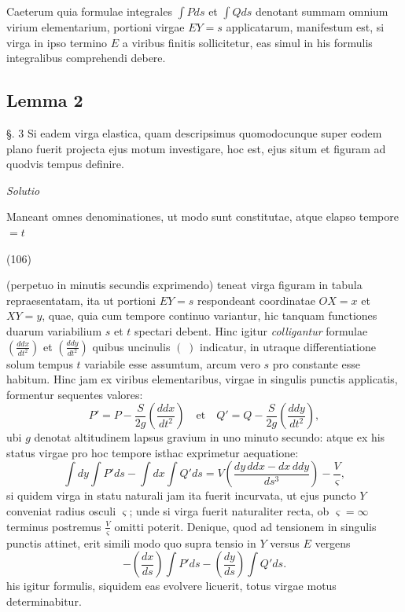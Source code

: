 \documentclass[11pt,a4paper]{article}
\begin{document}
Caeterum quia formulae integrales $\int Pds$ et $\int Qds$ denotant summam
omnium virium elementarium, portioni virgae $EY = s$ applicatarum,
manifestum est, si virga in ipso termino $E$ a viribus finitis
sollicitetur, eas simul in his formulis integralibus comprehendi debere.

\subsection{Lemma 2}

§. 3 Si eadem virga elastica, quam descripsimus quomodocunque super eodem
plano fuerit projecta ejus motum investigare, hoc est, ejus situm et
figuram ad quodvis tempus definire.

\emph{Solutio}

Maneant omnes denominationes, ut modo sunt constitutae, atque elapso
tempore $= t$

(106)

(perpetuo in minutis secundis exprimendo) teneat virga figuram in tabula
repraesentatam, ita ut portioni $EY = s$ respondeant coordinatae $OX = x$ et
$XY = y$, quae, quia cum tempore continuo variantur, hic tanquam functiones
duarum variabilium $s$ et $t$ spectari debent. Hinc igitur \emph{colligantur}
formulae $\left(\frac{ddx}{dt^2}\right)$ et $\left(\frac{ddy}{dt^2}\right)$
quibus uncinulis $(\;)$ indicatur, in utraque differentiatione solum tempus
$t$ variabile esse assumtum, arcum vero $s$ pro constante esse habitum. Hinc
jam ex viribus elementaribus, virgae in singulis punctis applicatis,
formentur sequentes valores:
\[
P' = P - \frac{S}{2g}\left(\frac{ddx}{dt^2}\right) \quad\text{et}\quad
Q' = Q - \frac{S}{2g}\left(\frac{ddy}{dt^2}\right),
\]
ubi $g$ denotat altitudinem lapsus gravium in uno minuto secundo: atque ex
his status virgae pro hoc tempore isthac exprimetur aequatione:
\[
\int dy \int P'ds - \int dx \int Q'ds
= V\left(\frac{dy\,ddx - dx\,ddy}{ds^3}\right) - \frac{V}{\varsigma},
\]
si quidem virga in statu naturali jam ita fuerit incurvata, ut ejus puncto
$Y$ conveniat radius osculi $\varsigma$; unde si virga fuerit naturaliter
recta, ob $\varsigma = \infty$ terminus postremus $\frac{V}{\varsigma}$
omitti poterit. Denique, quod ad tensionem in singulis punctis attinet, erit
simili modo quo supra tensio in $Y$ versus $E$ vergens
\[
-\left(\frac{dx}{ds}\right)\int P'ds - \left(\frac{dy}{ds}\right)\int Q'ds.
\]
his igitur formulis, siquidem eas evolvere licuerit, totus virgae motus
determinabitur.
\end{document}
